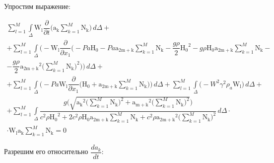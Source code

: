 \documentclass[14pt]{extreport}
\begin{document}
Упростим выражение:

\begin{multline*}
\sum_{l=1}^{M} \int\limits_{\Delta} \operatorname{W_{l}} \dfrac{\partial}{\partial t}\bigg(\operatorname{a_{k}} \sum_{k=1}^{M} \operatorname{N_{k}}\bigg)\, d\Delta +\\+ \sum_{l=1}^{M} \int\limits_{\Delta} \bigg(- \operatorname{W_{l}} \dfrac{\partial}{\partial x_{1}}\bigg(- Pa \operatorname{H_{0}} - Pa \operatorname{a_{2m+k}} \sum_{k=1}^{M} \operatorname{N_{k}} - \dfrac{g \rho}{2} \operatorname{H_{0}}^{2} - g \rho \operatorname{H_{0}} \operatorname{a_{2m+k}} \sum_{k=1}^{M} \operatorname{N_{k}} -\\- \dfrac{g \rho}{2} \operatorname{a_{2m+k}}^{2} \bigg(\sum\limits_{k=1}^{M} \operatorname{N_{k}}\bigg)^{2}\bigg)\bigg)\, d\Delta +\\+ \sum_{l=1}^{M} \int\limits_{\Delta} \bigg(- Pa \operatorname{W_{l}} \dfrac{\partial}{\partial x_{1}}\bigg(\operatorname{H_{0}} + \operatorname{a_{2m+k}} \sum_{k=1}^{M} \operatorname{N_{k}}\bigg)\bigg)\, d\Delta + \sum_{l=1}^{M} \int\limits_{\Delta} \bigg(- W^{2} \gamma^{2} \rho_{a} \operatorname{W_{l}}\bigg)\, d\Delta +\\+ \sum_{l=1}^{M} \int\limits_{\Delta} \dfrac{g \bigg(\sqrt{\operatorname{a_{k}}^{2} \bigg(\sum\limits_{k=1}^{M} \operatorname{N_{k}}\bigg)^{2} + \operatorname{a_{m+k}}^{2} \bigg(\sum\limits_{k=1}^{M} \operatorname{N_{k}}\bigg)^{2}}\bigg)}{c^{2} \rho \operatorname{H_{0}}^{2} + 2 c^{2} \rho \operatorname{H_{0}} \operatorname{a_{2m+k}} \sum\limits_{k=1}^{M} \operatorname{N_{k}} + c^{2} \rho \operatorname{a_{2m+k}}^{2} \bigg(\sum\limits_{k=1}^{M} \operatorname{N_{k}}\bigg)^{2}}\, d\Delta \cdot \\ \cdot \operatorname{W_{l}} \operatorname{a_{k}} \sum\limits_{k=1}^{M} \operatorname{N_{k}}=0
\end{multline*}

Разрешим его относительно $\dfrac{da_{k}}{dt}$:
\end{document}
